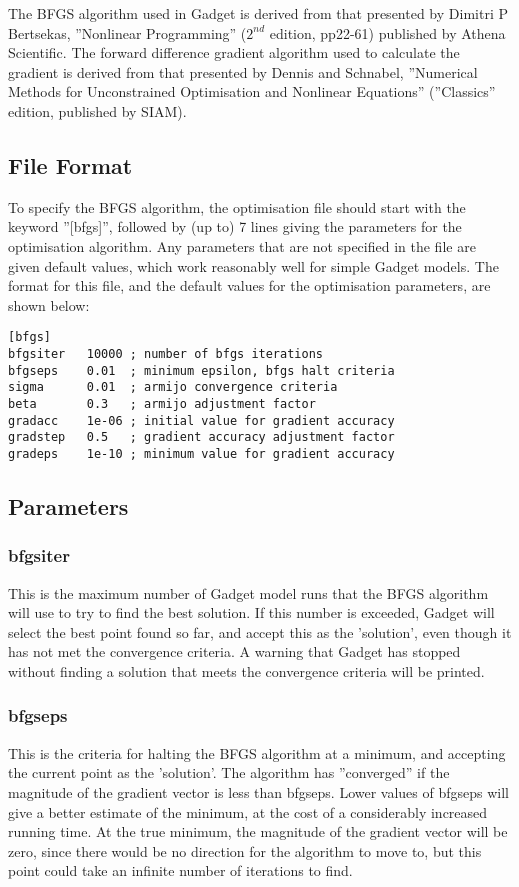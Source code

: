 \documentclass[10pt,twoside]{book}
\begin{document}
\bigskip
The BFGS algorithm used in Gadget is derived from that presented by Dimitri P Bertsekas, ''Nonlinear Programming'' ($2^{nd}$ edition, pp22-61) published by Athena Scientific.  The forward difference gradient algorithm used to calculate the gradient is derived from that presented by Dennis and Schnabel, ''Numerical Methods for Unconstrained Optimisation and Nonlinear Equations'' (''Classics'' edition, published by SIAM).

\subsection{File Format}\label{subsec:bfgsfile}
To specify the BFGS algorithm, the optimisation file should start with the keyword ''[bfgs]'', followed by (up to) 7 lines giving the parameters for the optimisation algorithm.  Any parameters that are not specified in the file are given default values, which work reasonably well for simple Gadget models.  The format for this file, and the default values for the optimisation parameters, are shown below:

{\small\begin{verbatim}
[bfgs]
bfgsiter   10000 ; number of bfgs iterations
bfgseps    0.01  ; minimum epsilon, bfgs halt criteria
sigma      0.01  ; armijo convergence criteria
beta       0.3   ; armijo adjustment factor
gradacc    1e-06 ; initial value for gradient accuracy
gradstep   0.5   ; gradient accuracy adjustment factor
gradeps    1e-10 ; minimum value for gradient accuracy
\end{verbatim}}

\subsection{Parameters}\label{subsec:bfgspar}
\subsubsection{bfgsiter}
This is the maximum number of Gadget model runs that the BFGS algorithm will use to try to find the best solution.  If this number is exceeded, Gadget will select the best point found so far, and accept this as the 'solution', even though it has not met the convergence criteria.  A warning that Gadget has stopped without finding a solution that meets the convergence criteria will be printed.

\subsubsection{bfgseps}
This is the criteria for halting the BFGS algorithm at a minimum, and accepting the current point as the 'solution'.  The algorithm has ''converged'' if the magnitude of the gradient vector is less than bfgseps.  Lower values of bfgseps will give a better estimate of the minimum, at the cost of a considerably increased running time.  At the true minimum, the magnitude of the gradient vector will be zero, since there would be no direction for the algorithm to move to, but this point could take an infinite number of iterations to find.
\end{document}
